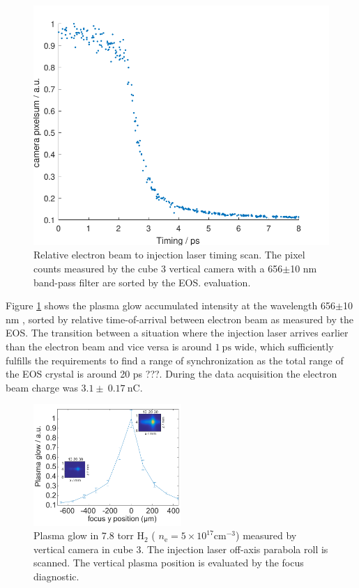 \begin{figure}[htbp]
\center
\includegraphics[width=1\textwidth]{experiment/images/raw/PlasmaGlow_20384_scatter.pdf}
\caption{Relative electron beam to injection laser timing scan. The pixel counts measured by the cube 3 vertical camera with a 656$\pm$10 nm  band-pass filter are sorted by the EOS. evaluation.}
\label{img:PlasmaGlowTimingOAP_H2He}
\end{figure}

Figure \ref{img:PlasmaGlowTimingOAP_H2He} shows the plasma glow accumulated intensity at the wavelength 656$\pm$10 nm , sorted by relative time-of-arrival between electron beam as measured by the EOS. The transition between a situation where the injection laser arrives earlier than the electron beam and vice versa is around $1\ \mathrm{ps}$ wide, which sufficiently fulfills the requirements to find a range of synchronization as the total range of the EOS crystal is around 20 ps ???.
During the data acquisition the electron beam charge was $3.1\pm \ 0.17\ \mathrm{nC}$. 

\begin{figure}[htbp]
\center
\includegraphics[width=0.5\textwidth]{experiment/images/edited/Plasma_Glow_roll.pdf}
\caption{Plasma glow in 7.8 torr $\mathrm{H}_2$ ( $n_\mathrm{e}=5\times10^{17}\mathrm{cm}^{-3} $) measured by vertical camera in cube 3. The injection laser off-axis parabola roll is scanned. The vertical plasma position is evaluated by the focus diagnostic.}
\label{img:PlasmaGlowRoll}
\end{figure}

